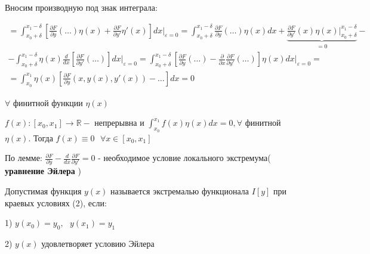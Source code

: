 \documentclass[12pt, a4paper]{report}
\begin{document}
Вносим производную под знак интеграла: 

\begin{gather*}
    \boxed{=} \int_{x_0 + \delta}^{x_1- \delta}\left[ \frac{\partial F}{\partial y }(\dots) \eta (x )+ \frac{\partial F}{\partial y'} \eta '(x)   \right] dx \bigg |_{\varepsilon=0}=   \int_{x_0 + \delta}^{x_1- \delta}\frac{\partial F}{\partial y }(\dots) \eta (x )dx+ \underbrace{\frac{\partial F}{\partial y'}(x) \eta (x) \bigg |^{x_1- \delta}_{x_0+\delta}    }_{=0}- \\
    -\int_{x_0 + \delta}^{x_1- \delta} \eta (x )\frac{d}{dx } \left[ \frac{\partial F}{\partial y' }(\dots) \right] dx \bigg | _{\varepsilon=0} =\int_{x_0 + \delta}^{x_1- \delta} \left[ \frac{\partial F}{\partial y}(\dots)- \frac{\partial}{\partial x} \frac{\partial F}{\partial y'}(\dots)    \right]\eta(x) dx \bigg |_{\varepsilon=0}  \boxed{=}  \\
    \boxed{=} \int_{x_0 }^{x_1} \eta(x) \left[ \frac{\partial F}{\partial y}(x,y(x),y'(x)) -  \dots \right] dx =0
\end{gather*}

\( \forall   \) финитной функции \( \eta (x)  \)

\begin{lemma}
    \( f(x) : [x_0,x_1] \to  \mathbb{R} -\) непрерывна и  \( \displaystyle \int_{x_0}^{x_1} f(x)\eta (x)dx=0, \forall   \) финитной \( \eta (x) \). Тогда \( f(x) \equiv 0 \text{ } \forall x \in  [x_0,x_1]   \) 
\end{lemma}

По лемме: \( \displaystyle \frac{\partial F}{\partial y}- \frac{d}{dx} \frac{\partial F}{\partial y '} =0     \) - необходимое условие локального экстремума( \textbf{уравнение Эйлера} )

\begin{definition}[экстремаль]
    Допустимая функция \( y(x) \) называется экстремалью функционала \( I[y] \)  при краевых условиях (2), если: 

    1) \( y(x_0)=y_0, \text{ } y(x_1)=y_1  \) 

    2) \( y(x) \) удовлетворяет условию Эйлера
\end{definition}



\ifdefined\mainfile
\else
    
\end{document}
